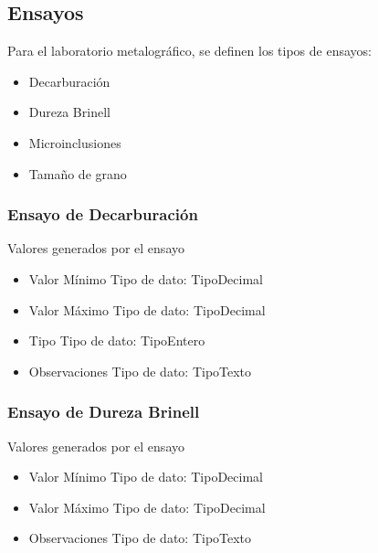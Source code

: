 \documentclass{article}
\begin{document}
\subsection{Ensayos}

\par Para el laboratorio metalográfico, se definen los tipos de ensayos:
\begin{itemize}
	\item Decarburación  
	\item Dureza Brinell
	\item Microinclusiones
	\item Tamaño de grano
\end{itemize}

\subsubsection{Ensayo de Decarburación  }

\par Valores generados por el ensayo
\begin{itemize}
	\item{Valor Mínimo} 
		\subitem Tipo de dato: \gls{TipoDecimal}
	\item{Valor Máximo} 
		\subitem Tipo de dato: \gls{TipoDecimal}
	\item{Tipo} 
		\subitem Tipo de dato: \gls{TipoEntero}
	\item{Observaciones}
		\subitem Tipo de dato: \gls{TipoTexto}
\end{itemize}
\subsubsection{Ensayo de Dureza Brinell }

\par Valores generados por el ensayo
\begin{itemize}
	\item{Valor Mínimo} 
		\subitem Tipo de dato: \gls{TipoDecimal}
	\item{Valor Máximo} 
		\subitem Tipo de dato: \gls{TipoDecimal}
	\item{Observaciones}
		\subitem Tipo de dato: \gls{TipoTexto}
\end{itemize}
\end{document}
